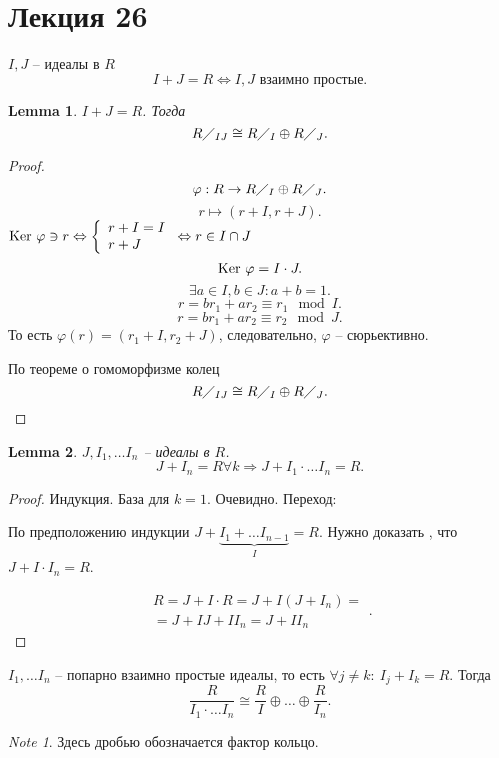 \documentclass[11pt]{book}
\newcommand{\ke}{{\mathop{\text{\rm Ker}}}~}
\theoremstyle{definition}
\theoremstyle{plain}
\theoremstyle{plain}
\newtheorem*{lm}{Lemma}
\theoremstyle{definition}
\theoremstyle{remark}
\newtheorem*{note}{Note}
\begin{document}
\section{Лекция 26}
$ I, J$ -- идеалы в $ R$ 
\[
I + J = R \Leftrightarrow  I, J \text{ взаимно простые}
.\] 
\begin{lm}
    $ I + J = R$. Тогда \[
	R \diagup _ {IJ} \cong R \diagup_I \oplus R \diagup _ J
    .\] 
\end{lm}
\begin{proof}
    \[
    \varphi : R \to  R \diagup_I \oplus R \diagup _ J
    .\] 
    \[
	r \mapsto (r + I, r + J)
    .\] 
    $ \ke \varphi  \ni r \Leftrightarrow 
    \left \{ 
	\begin{array}{l}
	    r + I = I \\
	    r + J
	\end{array}
	 \right .
	 \Leftrightarrow r \in  I \cap  J
	$
	\[
	\ke \varphi  = I \cdot J
	.\] 
	\[
	\exists  a \in I, b \in J: a + b = 1
	.\] 
	\[
	r = br_1+ar_2 \equiv r_1 \mod I
	.\] 
	\[
	r = br_1+ar_2 \equiv r_2 \mod J
	.\] 
	То есть $ \varphi (r) =  (r_1 + I, r_2 + J)$, следовательно, $ \varphi $ -- сюрьективно.

	По теореме о гомоморфизме колец \[
	    R \diagup _{IJ} \cong R\diagup_I \oplus R\diagup_J
	.\] 
\end{proof}
\begin{lm}
    $ J, I_1, \ldots I_n $ --  идеалы в $ R$. 
    \[
    J + I_n = R \forall k \Longrightarrow J + I_1 \cdot \ldots I_n = R
    .\] 
\end{lm}
\begin{proof}
    Индукция.
    База для $ k=1$. Очевидно.
    Переход:

    По предположению индукции $ J + \underbrace{I_1 + \ldots  I_{n-1}}_{I} = R$. Нужно доказать , что $ J + I \cdot I_n = R$.

     \[
	 \begin{array}{l}
	     R = J + I\cdot R = J + I(J + I_n) = \\
	     = J + I J + I I _n  = J + I I_n
     \end{array}
     .\] 
\end{proof}
\begin{thm}
    $ I_1, \ldots  I_n$ -- попарно взаимно простые идеалы, то есть $ \forall  j \ne k:~ I_j + I_k = R$.
    Тогда \[
	\frac{R}{I_1\cdot \ldots I_n } \cong \frac{R}{I} \oplus \ldots  \oplus \frac{R}{I_n}
    .\] 
    \begin{note}
        Здесь дробью обозначается фактор кольцо.
    \end{note}
\end{thm}
\end{document}
